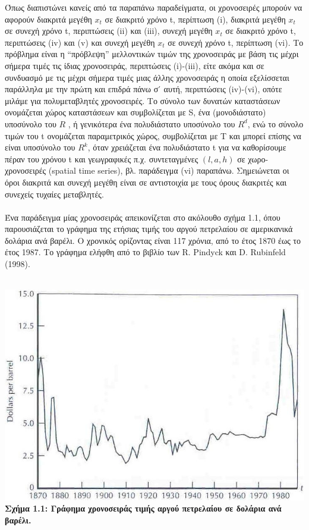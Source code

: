 Όπως διαπιστώνει κανείς από τα παραπάνω παραδείγματα, οι χρονοσειρές μπορούν
να αφορούν διακριτά μεγέθη $ x_t $ σε διακριτό χρόνο t, περίπτωση (i), διακριτά μεγέθη
$ x_t $ σε συνεχή χρόνο t, περιπτώσεις (ii) και (iii), συνεχή μεγέθη $x_t$ σε διακριτό χρόνο t, περιπτώσεις (iv) και (v) και συνεχή μεγέθη $x_t$ σε συνεχή χρόνο t, περίπτωση (vi).
Το πρόβλημα είναι η “πρόβλεψη” μελλοντικών τιμών της χρονοσειράς με βάση τις
μέχρι σήμερα τιμές τις ίδιας χρονοσειράς, περιπτώσεις (i)-(iii), είτε ακόμα και σε
συνδυασμό με τις μέχρι σήμερα τιμές μιας άλλης χρονοσειράς η οποία εξελίσσεται
παράλληλα με την πρώτη και επιδρά πάνω σ ́ αυτή, περιπτώσεις (iv)-(vi), οπότε
μιλάμε για πολυμεταβλητές χρονοσειρές. Το σύνολο των δυνατών καταστάσεων
ονομάζεται χώρος καταστάσεων και συμβολίζεται με S, ένα (μονοδιάστατο)
υποσύνολο του  $ R $   , ή γενικότερα ένα πολυδιάστατο υποσύνολο του $ R^d $, ενώ το
σύνολο τιμών του t ονομάζεται παραμετρικός χώρος, συμβολίζεται με Τ και μπορεί
επίσης να είναι υποσύνολο του $ R^k $, όταν χρειάζεται ένα πολυδιάστατο t για να
καθορίσουμε πέραν του χρόνου t και γεωγραφικές π.χ. συντεταγμένες $\left( l,a,h \right)$ σε
χωρο-χρονοσειρές (spatial time series), βλ. παράδειγμα (vi) παραπάνω. Σημειώνεται
οι όροι διακριτά και συνεχή μεγέθη είναι σε αντιστοιχία με τους όρους διακριτές και
συνεχείς τυχαίες μεταβλητές. \\ \\
Ένα παράδειγμα μίας χρονοσειράς απεικονίζεται στο ακόλουθο σχήμα 1.1, όπου παρουσιάζεται το γράφημα
της ετήσιας τιμής του αργού πετρελαίου σε αμερικανικά δολάρια ανά βαρέλι. Ο χρονικός ορίζοντας είναι 117 χρόνια, από το έτος 1870 έως το έτος 1987. Το γράφημα ελήφθη από το βιβλίο των R. Pindyck και
D. Rubinfeld (1998).\\\\
\begin{center}
\includegraphics[scale=0.4]{graf1.png}\\   
\textbf{Σχήμα 1.1: Γράφημα χρονοσειράς τιμής αργού πετρελαίου σε δολάρια ανά βαρέλι.}
\end{center} 
\linespread{1}



